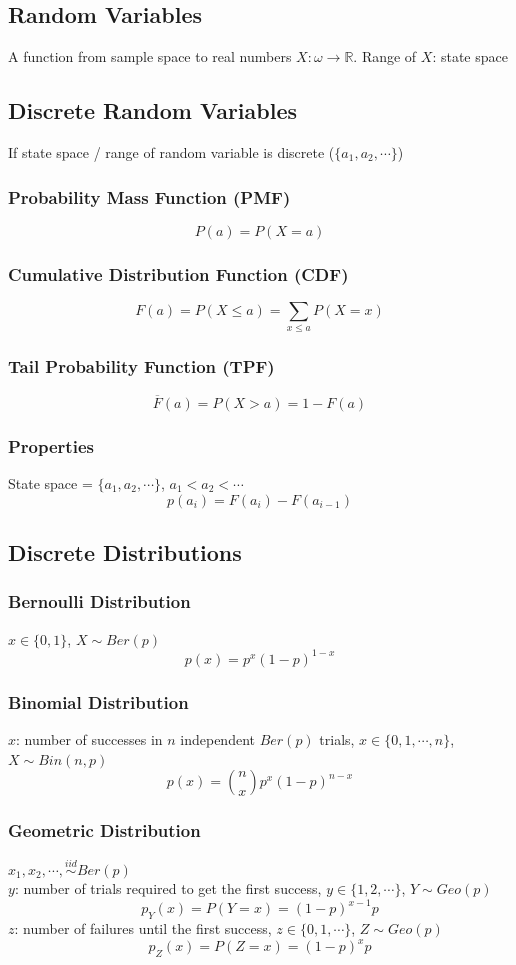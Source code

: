\documentclass[11pt]{article}
\newcommand{\R}{{\mathbb{R}}}
\begin{document}
\subsection{Random Variables}
A function from sample space to real numbers $X:\omega\to\R$. Range of $X$: state space 
\subsection{Discrete Random Variables}
If state space / range of random variable is discrete ($\{a_1,a_2,\cdots\}$)
\subsubsection*{Probability Mass Function (PMF)}
\[P(a) = P(X=a)\]
\subsubsection*{Cumulative Distribution Function (CDF)}
\[F(a) = P(X\leq a) = \sum_{x\leq a}P(X=x)\]
\subsubsection*{Tail Probability Function (TPF)}
\[\overline{F}(a) = P(X>a) = 1-F(a)\]
\subsubsection*{Properties}
State space = $\{a_1,a_2,\cdots\}$, $a_1<a_2<\cdots$
\[p(a_i) = F(a_i) - F(a_{i-1})\]
\subsection{Discrete Distributions}
\subsubsection*{Bernoulli Distribution}
$x\in\{0,1\}$, $X\sim Ber(p)$
\[p(x) = p^x(1-p)^{1-x}\]
\subsubsection*{Binomial Distribution}
$x$: number of successes in $n$ independent $Ber(p)$ trials, $x\in\{0,1,\cdots,n\}$, $X\sim Bin(n, p)$
\[p(x) = \binom{n}{x}p^x(1-p)^{n-x}\]
\subsubsection*{Geometric Distribution}
$x_1,x_2,\cdots,\overset{iid}{\sim}Ber(p)$ \\
$y$: number of trials required to get the first success, $y\in\{1,2,\cdots\}$, $Y\sim Geo(p)$
\[p_Y(x) = P(Y=x) = (1-p)^{x-1}p\]
$z$: number of failures until the first success, $z\in\{0,1,\cdots\}$, $Z\sim Geo(p)$
\[p_Z(x) = P(Z=x) = (1-p)^{x}p\]
\end{document}
